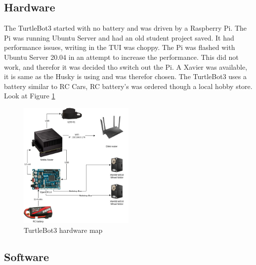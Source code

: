 \subsection{Hardware}
The TurtleBot3 started with no battery and was driven by a Raspberry Pi. The Pi was running Ubuntu Server and had an old student project saved. It had performance issues, writing in the TUI was choppy. The Pi was flashed with Ubuntu Server 20.04 in an attempt to increase the performance. This did not work, and therefor it was decided tho switch out the Pi. A Xavier was available, it is same as the Husky is using and was therefor chosen. The TurtleBot3 uses a battery similar to RC Cars, RC battery's was ordered though a local hobby store. Look at Figure \ref{fig:TB3Hardware}

\begin{figure}[H]
    \centering
    \includegraphics[width = 0.5\textwidth]{Figures/drawio/TB_HW.drawio.png}
    \caption{TurtleBot3 hardware map}
    \label{fig:TB3Hardware}
\end{figure}

\subsection{Software}
